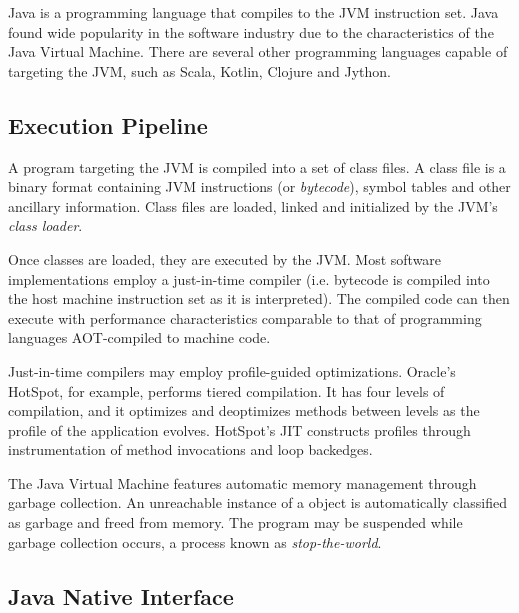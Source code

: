 Java is a programming language that compiles to the JVM instruction set. Java found wide popularity in the software industry due to the characteristics of the Java Virtual Machine. There are several other programming languages capable of targeting the JVM, such as Scala, Kotlin, Clojure and Jython.

\subsection{Execution Pipeline}

A program targeting the JVM is compiled into a set of class files. A class file is a binary format containing JVM instructions (or \emph{bytecode}), symbol tables and other ancillary information. Class files are loaded, linked and initialized by the JVM's \emph{class loader}.

Once classes are loaded, they are executed by the JVM. Most software implementations employ a just-in-time compiler (i.e. bytecode is compiled into the host machine instruction set as it is interpreted). The compiled code can then execute with performance characteristics comparable to that of programming languages AOT-compiled to machine code.

Just-in-time compilers may employ profile-guided optimizations. Oracle's HotSpot, for example, performs tiered compilation. It has four levels of compilation, and it optimizes and deoptimizes methods between levels as the profile of the application evolves. HotSpot's JIT constructs profiles through instrumentation of method invocations and loop backedges.

The Java Virtual Machine features automatic memory management through garbage collection. An unreachable instance of a object is automatically classified as garbage and freed from memory. The program may be suspended while garbage collection occurs, a process known as \emph{stop-the-world}.



\subsection{Java Native Interface}




